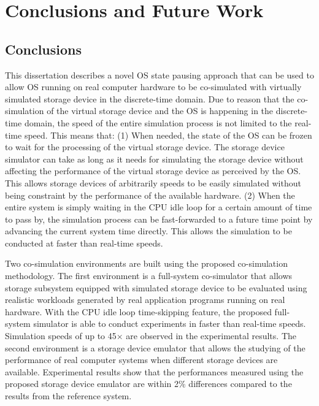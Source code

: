 \chapter{Conclusions and Future Work}
\label{ch:7}

\section{Conclusions}

This dissertation describes a novel OS state pausing approach that can be used to allow OS running on real computer hardware to be co-simulated with virtually simulated storage device in the discrete-time domain. Due to reason that the co-simulation of the virtual storage device and the OS is happening in the discrete-time domain, the speed of the entire simulation process is not limited to the real-time speed. This means that: (1) When needed, the state of the OS can be frozen to wait for the processing of the virtual storage device. The storage device simulator can take as long as it needs for simulating the storage device without affecting the performance of the virtual storage device as perceived by the OS. This allows storage devices of arbitrarily speeds to be easily simulated without being constraint by the performance of the available hardware. (2) When the entire system is simply waiting in the CPU idle loop for a certain amount of time to pass by, the simulation process can be fast-forwarded to a future time point by advancing the current system time directly. This allows the simulation to be conducted at faster than real-time speeds.

Two co-simulation environments are built using the proposed co-simulation methodology. The first environment is a full-system co-simulator that allows storage subsystem equipped with simulated storage device to be evaluated using realistic workloads generated by real application programs running on real hardware. With the CPU idle loop time-skipping feature, the proposed full-system simulator is able to conduct experiments in faster than real-time speeds. Simulation speeds of up to 45$\times$ are observed in the experimental results. The second environment is a storage device emulator that allows the studying of the performance of real computer systems when different storage devices are available. Experimental results show that the performances measured using the proposed storage device emulator are within 2\% differences compared to the results from the reference system. 

